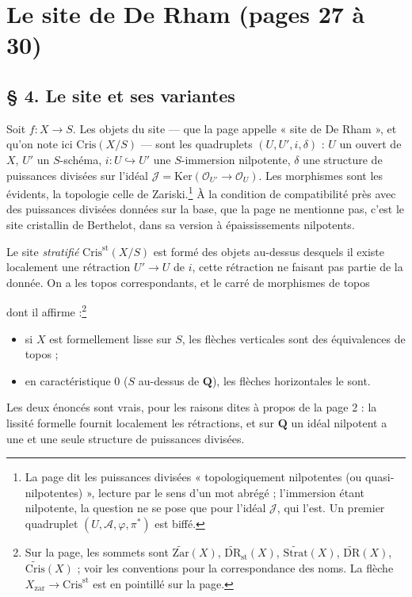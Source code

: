 \documentclass[11pt,a4paper]{article}
\begin{document}
\section*{Le site de De Rham (pages 27 à 30)}

\subsection*{§ 4. Le site et ses variantes}

Soit $f : X \to S$. Les objets du site --- que la page appelle « site de De
Rham », et qu'on note ici $\mathrm{Cris}(X/S)$ --- sont les quadruplets
$(U, U', i, \delta)$ : $U$ un ouvert de $X$, $U'$ un $S$-schéma,
$i : U \hookrightarrow U'$ une $S$-immersion nilpotente, $\delta$ une
structure de puissances divisées sur l'idéal $\mathcal{J} =
\mathrm{Ker}(\mathcal{O}_{U'} \to \mathcal{O}_U)$. Les morphismes sont les
évidents, la topologie celle de Zariski.\footnote{La page dit les
puissances divisées « topologiquement nilpotentes (ou quasi-nilpotentes) »,
lecture par le sens d'un mot abrégé ; l'immersion étant nilpotente, la
question ne se pose que pour l'idéal $\mathcal{J}$, qui l'est. Un premier
quadruplet $(U, \mathcal{A}, \varphi, \pi^{*})$ est biffé.} À la condition
de compatibilité près avec des puissances divisées données sur la base, que
la page ne mentionne pas, c'est le site cristallin de Berthelot, dans sa
version à épaississements nilpotents.

Le site \emph{stratifié} $\mathrm{Cris}^{\mathrm{st}}(X/S)$ est formé des
objets au-dessus desquels il existe localement une rétraction $U' \to U$ de
$i$, cette rétraction ne faisant pas partie de la donnée. On a les topos
correspondants, et le carré de morphismes de topos
dont il affirme :\footnote{Sur la page, les sommets sont
$\widetilde{\mathrm{Zar}}(X)$, $\widetilde{\mathrm{DR}}_{\mathrm{st}}(X)$,
$\widetilde{\mathrm{Strat}}(X)$, $\widetilde{\mathrm{DR}}(X)$,
$\widetilde{\mathrm{Cris}}(X)$ ; voir les conventions pour la
correspondance des noms. La flèche $X_{\mathrm{zar}} \to
\mathrm{Cris}^{\mathrm{st}}$ est en pointillé sur la page.}
\begin{itemize}
\item si $X$ est formellement lisse sur $S$, les flèches verticales sont
des équivalences de topos ;
\item en caractéristique $0$ ($S$ au-dessus de $\mathbf{Q}$), les flèches
horizontales le sont.
\end{itemize}
Les deux énoncés sont vrais, pour les raisons dites à propos de la page
2 : la lissité formelle fournit localement les rétractions, et sur
$\mathbf{Q}$ un idéal nilpotent a une et une seule structure de puissances
divisées.
\end{document}
